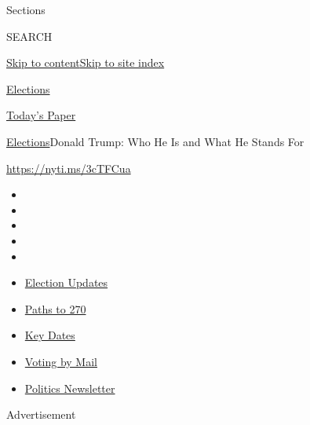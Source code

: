 Sections

SEARCH

\protect\hyperlink{site-content}{Skip to
content}\protect\hyperlink{site-index}{Skip to site index}

\href{https://www.nytimes3xbfgragh.onion/news-event/2020-election}{Elections}

\href{https://myaccount.nytimes3xbfgragh.onion/auth/login?response_type=cookie\&client_id=vi}{}

\href{https://www.nytimes3xbfgragh.onion/section/todayspaper}{Today's
Paper}

\href{/news-event/2020-election}{Elections}\textbar{}Donald Trump: Who
He Is and What He Stands For

\url{https://nyti.ms/3cTFCua}

\begin{itemize}
\item
\item
\item
\item
\item
\end{itemize}

\begin{itemize}
\item
  \href{https://www.nytimes3xbfgragh.onion/live/2020/09/11/us/trump-vs-biden?action=click\&pgtype=Article\&state=default\&region=TOP_BANNER\&context=storylines_menu}{Election
  Updates}
\item
  \href{https://www.nytimes3xbfgragh.onion/interactive/2020/us/elections/election-states-biden-trump.html?action=click\&pgtype=Article\&state=default\&region=TOP_BANNER\&context=storylines_menu}{Paths
  to 270}
\item
  \href{https://www.nytimes3xbfgragh.onion/interactive/2019/us/elections/2020-presidential-election-calendar.html?action=click\&pgtype=Article\&state=default\&region=TOP_BANNER\&context=storylines_menu}{Key
  Dates}
\item
  \href{https://www.nytimes3xbfgragh.onion/interactive/2020/08/31/us/politics/vote-by-mail-deadlines.html?action=click\&pgtype=Article\&state=default\&region=TOP_BANNER\&context=storylines_menu}{Voting
  by Mail}
\item
  \href{https://www.nytimes3xbfgragh.onion/newsletters/politics?action=click\&pgtype=Article\&state=default\&region=TOP_BANNER\&context=storylines_menu}{Politics
  Newsletter}
\end{itemize}

Advertisement


